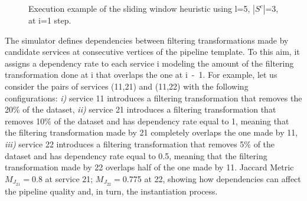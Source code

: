 \begin{figure}[!t]
{
      }
      \caption{Execution example of the sliding window heuristic using l=5, $|S^c|$=3,  at i=1 step.}
      \label{fig:execution_example}
    \end{figure}

    The simulator defines dependencies between filtering transformations made by candidate services at consecutive vertices of the pipeline template.
    To this aim, it assigns a dependency rate to each service \si{i} modeling the amount of the filtering transformation done at \si{i} that overlaps the one at \si{i-1}.
    For example, let us consider the pairs of services (\si{11},\si{21}) and (\si{11},\si{22}) with the following configurations: \emph{i)} service \si{11} introduces a filtering transformation that removes the 20\% of the dataset, \emph{ii)} service \si{21} introduces a filtering transformation that removes 10\% of the dataset and has dependency rate equal to 1, meaning that the filtering transformation made by \si{21} completely overlaps the one made by \si{11}, \emph{iii)} service \si{22} introduces a filtering transformation that removes 5\% of the dataset and has dependency rate equal to 0.5, meaning that the filtering transformation made by \si{22} overlaps half of the one made by \si{11}. Jaccard Metric $M_{J_{21}}$$=$0.8 at service \si{21}; $M_{J_{22}}$$=$0.775 at \si{22}, showing how dependencies can affect the pipeline quality and, in turn, the instantiation process.


